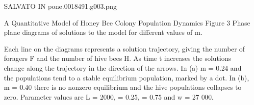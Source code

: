 SALVATO IN pone.0018491.g003.png

A Quantitative Model of Honey Bee Colony Population Dynamics
Figure 3
Phase plane diagrams of solutions to the model for different values of m.

Each line on the diagrams represents a solution trajectory, giving the number of foragers F and the number of hive bees H. As time t increases the solutions change along the trajectory in the direction of the arrows. In (a) m = 0.24 and the populations tend to a stable equilibrium population, marked by a dot. In (b), m = 0.40 there is no nonzero equilibrium and the hive populations collapses to zero. Parameter values are L = 2000,  = 0.25,  = 0.75 and w = 27 000.
